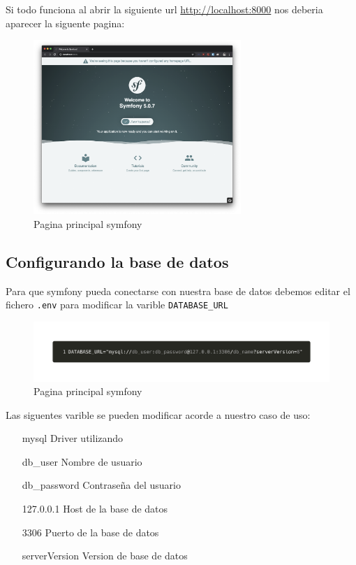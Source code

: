 Si todo funciona al abrir la siguiente url \href{http://localhost:8000}{http://localhost:8000} nos deberia aparecer la siguente pagina:

\begin{figure}[ht]
  \centering
  \includegraphics[width=0.7\textwidth]{../assets/symfony_main.png}
  \caption{Pagina principal symfony}
  \label{fig:symfony_main}
\end{figure}
\clearpage
\subsection{Configurando la base de datos}
Para que symfony pueda conectarse con nuestra base de datos debemos editar el fichero \texttt{.env} para modificar la varible \texttt{DATABASE\_URL}
\begin{figure}[ht]
  \centering
  \includegraphics[width=\textwidth]{../assets/symfony_dot_env.png}
  \caption{Pagina principal symfony}
  \label{fig:symfony_dot_env}
\end{figure}

Las siguentes varible se pueden modificar acorde a nuestro caso de uso:

\begin{center}
  \begin{minipage}{0.4\textwidth}
    \begin{itemize}
      \item[mysql] Driver utilizando
      \item[db\_user] Nombre de usuario
      \item[db\_password] Contraseña del usuario
      \item[127.0.0.1] Host de la base de datos
      \item[3306] Puerto de la base de datos
      \item[serverVersion] Version de base de datos
    \end{itemize}
  \end{minipage}
\end{center}

